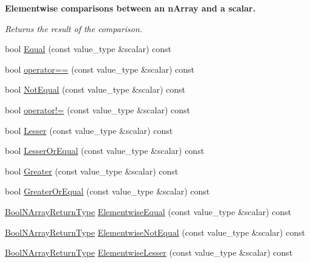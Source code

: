 \begin{Indent}{\bf Elementwise comparisons between an n\+Array and a scalar.}\par
{\em Returns the result of the comparison. }\begin{DoxyCompactItemize}
\item 
bool \hyperlink{classvct_dynamic_const_n_array_base_ad362d1ebbee3e4b4c80b729f9e0487ac}{Equal} (const value\+\_\+type \&scalar) const 
\item 
bool \hyperlink{classvct_dynamic_const_n_array_base_a045b16984512ae1ffa3914d96baf2b0c}{operator==} (const value\+\_\+type \&scalar) const 
\item 
bool \hyperlink{classvct_dynamic_const_n_array_base_a899db7397e15e6daa1403cb6b117b5d6}{Not\+Equal} (const value\+\_\+type \&scalar) const 
\item 
bool \hyperlink{classvct_dynamic_const_n_array_base_a8cb0651c3eb2c46d8bbdfb4d5aa66f6d}{operator!=} (const value\+\_\+type \&scalar) const 
\item 
bool \hyperlink{classvct_dynamic_const_n_array_base_a7dc65080abbe1fa0200a92ea52b78cd6}{Lesser} (const value\+\_\+type \&scalar) const 
\item 
bool \hyperlink{classvct_dynamic_const_n_array_base_ac0ef675164ea66b6fcc342d245719f71}{Lesser\+Or\+Equal} (const value\+\_\+type \&scalar) const 
\item 
bool \hyperlink{classvct_dynamic_const_n_array_base_a9ca880f2e8a85234665c919470ae4df0}{Greater} (const value\+\_\+type \&scalar) const 
\item 
bool \hyperlink{classvct_dynamic_const_n_array_base_a7595cf8870953193090ba80d1fe12087}{Greater\+Or\+Equal} (const value\+\_\+type \&scalar) const 
\item 
\hyperlink{classvct_dynamic_const_n_array_base_a983f2b7edd51a896d447383b5a5af289}{Bool\+N\+Array\+Return\+Type} \hyperlink{classvct_dynamic_const_n_array_base_aa5a7d14eb9cf3070449e4a74a6e2caf1}{Elementwise\+Equal} (const value\+\_\+type \&scalar) const 
\item 
\hyperlink{classvct_dynamic_const_n_array_base_a983f2b7edd51a896d447383b5a5af289}{Bool\+N\+Array\+Return\+Type} \hyperlink{classvct_dynamic_const_n_array_base_ab6af7dba17e29d037bded30136a9bd6e}{Elementwise\+Not\+Equal} (const value\+\_\+type \&scalar) const 
\item 
\hyperlink{classvct_dynamic_const_n_array_base_a983f2b7edd51a896d447383b5a5af289}{Bool\+N\+Array\+Return\+Type} \hyperlink{classvct_dynamic_const_n_array_base_a9e034008c80af9d33e13cd8864e5fbce}{Elementwise\+Lesser} (const value\+\_\+type \&scalar) const 

\end{DoxyCompactItemize}
\end{Indent}
